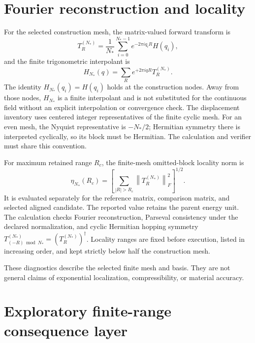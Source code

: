 \documentclass[11pt]{article}
\newcommand{\norm}[1]{\left\lVert #1\right\rVert}
\begin{document}
\section{Fourier reconstruction and locality}

For the selected construction mesh, the matrix-valued forward transform is
\begin{equation}
 T_R^{(N_*)}=\frac{1}{N_*}\sum_{i=0}^{N_*-1}
 e^{-2\pi iq_iR}H(q_i),
 \label{eq:forward-fourier}
\end{equation}
and the finite trigonometric interpolant is
\begin{equation}
 H_{N_*}(q)=\sum_R e^{+2\pi iqR}T_R^{(N_*)}.
 \label{eq:inverse-fourier}
\end{equation}
The identity $H_{N_*}(q_i)=H(q_i)$ holds at the construction nodes. Away from those
nodes, $H_{N_*}$ is a finite interpolant and is not substituted for the continuous field
without an explicit interpolation or convergence check. The displacement inventory uses
centered integer representatives of the finite cyclic mesh. For an even mesh, the
Nyquist representative is $-N_*/2$; Hermitian symmetry there is interpreted cyclically,
so its block must be Hermitian. The calculation and verifier must share this convention.

For maximum retained range $R_c$, the finite-mesh omitted-block locality norm is
\begin{equation}
 \eta_{N_*}(R_c)=
 \left[
 \sum_{|R|>R_c}\norm{T_R^{(N_*)}}_F^2
 \right]^{1/2}.
 \label{eq:locality}
\end{equation}
It is evaluated separately for the reference matrix, comparison matrix, and selected
aligned candidate. The reported value retains the parent energy unit. The calculation
checks Fourier reconstruction, Parseval consistency under the declared normalization,
and cyclic Hermitian hopping symmetry
$T_{(-R)\bmod N_*}^{(N_*)}=(T_R^{(N_*)})^\dagger$. Locality ranges are fixed before
execution, listed in increasing order, and kept strictly below half the construction
mesh.

These diagnostics describe the selected finite mesh and basis. They are not general
claims of exponential localization, compressibility, or material accuracy.

\section{Exploratory finite-range consequence layer}
\end{document}

